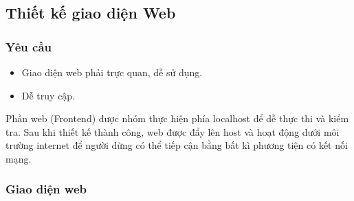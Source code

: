 \subsection{Thiết kế giao diện Web}
\subsubsection{Yêu cầu}
\begin{itemize}
\item Giao diện web phải trực quan, dễ sử dụng.
\item Dễ truy cập.
\end{itemize}
Phần web (Frontend) được nhóm thực hiện phía localhost để dễ thực thi và kiểm tra. Sau khi thiết kế thành công, web được đẩy lên host và hoạt động dưới môi trường internet để người dừng có thể tiếp cận bằng bất kì phương tiện có kết nối mạng.
\subsubsection{Giao diện web}
